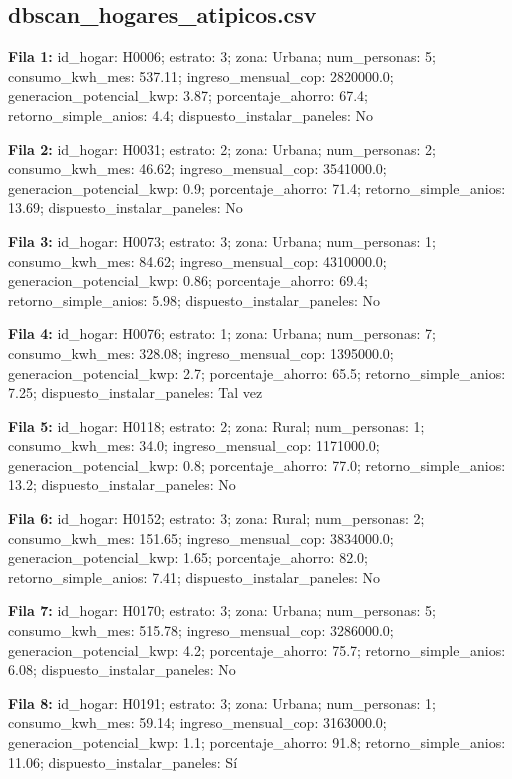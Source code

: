 \subsection*{dbscan\_hogares\_atipicos.csv}
{\footnotesize\textbf{Fila 1:} id\_hogar: H0006; estrato: 3; zona: Urbana; num\_personas: 5; consumo\_kwh\_mes: 537.11; ingreso\_mensual\_cop: 2820000.0; generacion\_potencial\_kwp: 3.87; porcentaje\_ahorro: 67.4; retorno\_simple\_anios: 4.4; dispuesto\_instalar\_paneles: No\par}
{\footnotesize\textbf{Fila 2:} id\_hogar: H0031; estrato: 2; zona: Urbana; num\_personas: 2; consumo\_kwh\_mes: 46.62; ingreso\_mensual\_cop: 3541000.0; generacion\_potencial\_kwp: 0.9; porcentaje\_ahorro: 71.4; retorno\_simple\_anios: 13.69; dispuesto\_instalar\_paneles: No\par}
{\footnotesize\textbf{Fila 3:} id\_hogar: H0073; estrato: 3; zona: Urbana; num\_personas: 1; consumo\_kwh\_mes: 84.62; ingreso\_mensual\_cop: 4310000.0; generacion\_potencial\_kwp: 0.86; porcentaje\_ahorro: 69.4; retorno\_simple\_anios: 5.98; dispuesto\_instalar\_paneles: No\par}
{\footnotesize\textbf{Fila 4:} id\_hogar: H0076; estrato: 1; zona: Urbana; num\_personas: 7; consumo\_kwh\_mes: 328.08; ingreso\_mensual\_cop: 1395000.0; generacion\_potencial\_kwp: 2.7; porcentaje\_ahorro: 65.5; retorno\_simple\_anios: 7.25; dispuesto\_instalar\_paneles: Tal vez\par}
{\footnotesize\textbf{Fila 5:} id\_hogar: H0118; estrato: 2; zona: Rural; num\_personas: 1; consumo\_kwh\_mes: 34.0; ingreso\_mensual\_cop: 1171000.0; generacion\_potencial\_kwp: 0.8; porcentaje\_ahorro: 77.0; retorno\_simple\_anios: 13.2; dispuesto\_instalar\_paneles: No\par}
{\footnotesize\textbf{Fila 6:} id\_hogar: H0152; estrato: 3; zona: Rural; num\_personas: 2; consumo\_kwh\_mes: 151.65; ingreso\_mensual\_cop: 3834000.0; generacion\_potencial\_kwp: 1.65; porcentaje\_ahorro: 82.0; retorno\_simple\_anios: 7.41; dispuesto\_instalar\_paneles: No\par}
{\footnotesize\textbf{Fila 7:} id\_hogar: H0170; estrato: 3; zona: Urbana; num\_personas: 5; consumo\_kwh\_mes: 515.78; ingreso\_mensual\_cop: 3286000.0; generacion\_potencial\_kwp: 4.2; porcentaje\_ahorro: 75.7; retorno\_simple\_anios: 6.08; dispuesto\_instalar\_paneles: No\par}
{\footnotesize\textbf{Fila 8:} id\_hogar: H0191; estrato: 3; zona: Urbana; num\_personas: 1; consumo\_kwh\_mes: 59.14; ingreso\_mensual\_cop: 3163000.0; generacion\_potencial\_kwp: 1.1; porcentaje\_ahorro: 91.8; retorno\_simple\_anios: 11.06; dispuesto\_instalar\_paneles: Sí\par}
